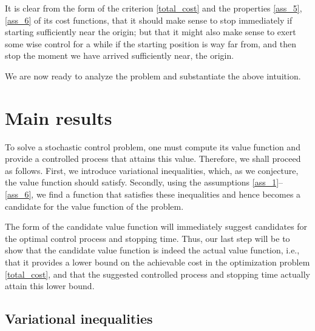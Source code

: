 \documentclass[11pt,tbtags,reqno]{article}
\theoremstyle{definition}
\numberwithin{equation}{section}
\theoremstyle{definition}
\begin{document}
It is clear from the form of the criterion \eqref{total_cost} and the properties \ref{ass_5}, \ref{ass_6} of its cost functions, that it should make sense to stop immediately if starting sufficiently near the origin; but that it might also make sense to exert some wise control for a while if the starting position is way far from, and then stop the moment we have arrived sufficiently near, the origin. 

We are now ready to analyze the problem and substantiate the above intuition.

\section{Main results}\label{section_main_results}

To solve a stochastic control problem, one must compute its value function and provide a controlled process that attains this value. Therefore, we shall proceed as follows. First, we introduce variational inequalities, which, as we conjecture, the value function should satisfy. Secondly, using the assumptions \ref{ass_1}--\ref{ass_6}, we find a function that satisfies these inequalities and hence becomes a candidate for the value function of the problem. 

\vspace{-7pt}
The form of the candidate value function will immediately suggest candidates for the optimal control process and stopping time. Thus, our last step will be to show that the candidate value function is indeed the actual value function, i.e., that it provides a lower bound on the achievable cost in the optimization problem \eqref{total_cost}, and that the suggested controlled process and stopping time actually attain this lower bound.

\subsection{Variational inequalities}\label{subsec_var_inequalities}
\end{document}
